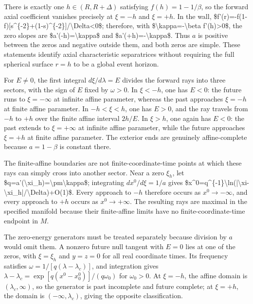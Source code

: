 \documentclass[11pt]{article}
\begin{document}
There is exactly one $h\in(R,R+\Delta)$ satisfying $f(h)=1-1/\beta$, so the forward axial coefficient vanishes precisely at $\xi=-h$ and $\xi=+h$. In the wall, \$f'(r)=-f(1-f)[s\textasciicircum{}\{-2\}+(1-s)\textasciicircum{}\{-2\}]/\textbackslash{}Delta\textless{}0\$; therefore, with \$\textbackslash{}kappa=-\textbackslash{}beta f'(h)\textgreater{}0\$, the zero slopes are \$a'(-h)=\textbackslash{}kappa\$ and \$a'(+h)=-\textbackslash{}kappa\$. Thus $a$ is positive between the zeros and negative outside them, and both zeros are simple. These statements identify axial characteristic separatrices without requiring the full spherical surface $r=h$ to be a global event horizon.

For $E\neq0$, the first integral $d\xi/d\lambda=E$ divides the forward rays into three sectors, with the sign of $E$ fixed by $\omega>0$. In $\xi<-h$, one has $E<0$: the future runs to $\xi=-\infty$ at infinite affine parameter, whereas the past approaches $\xi=-h$ at finite affine parameter. In $-h<\xi<h$, one has $E>0$, and the ray travels from $-h$ to $+h$ over the finite affine interval $2h/E$. In $\xi>h$, one again has $E<0$: the past extends to $\xi=+\infty$ at infinite affine parameter, while the future approaches $\xi=+h$ at finite affine parameter. The exterior ends are genuinely affine-complete because $a=1-\beta$ is constant there.

The finite-affine boundaries are not finite-coordinate-time points at which these rays can simply cross into another sector. Near a zero $\xi_h$, let \$q=a'(\textbackslash{}xi\_h)=\textbackslash{}pm\textbackslash{}kappa\$; integrating $dx^0/d\xi=1/a$ gives \$x\textasciicircum{}0=q\textasciicircum{}\{-1\}\textbackslash{}ln(|\textbackslash{}xi-\textbackslash{}xi\_h|/\textbackslash{}Delta)+O(1)\$. Every approach to $-h$ therefore occurs as $x^0\to-\infty$, and every approach to $+h$ occurs as $x^0\to+\infty$. The resulting rays are maximal in the specified manifold because their finite-affine limits have no finite-coordinate-time endpoint in $M$.

The zero-energy generators must be treated separately because division by $a$ would omit them. A nonzero future null tangent with $E=0$ lies at one of the zeros, with $\xi=\xi_h$ and $y=z=0$ for all real coordinate times. Its frequency satisfies $\omega=1/[q(\lambda-\lambda_c)]$, and integration gives $\lambda-\lambda_c=\exp[q(x^0-x^0_0)]/(q\omega_0)$ for $\omega_0>0$. At $\xi=-h$, the affine domain is $(\lambda_c,\infty)$, so the generator is past incomplete and future complete; at $\xi=+h$, the domain is $(-\infty,\lambda_c)$, giving the opposite classification.
\end{document}

